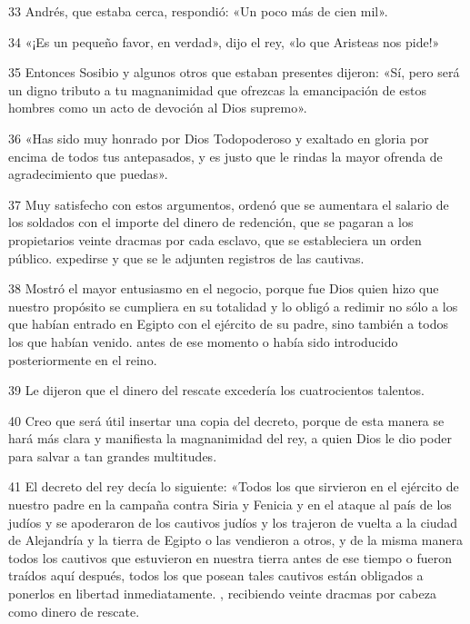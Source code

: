 \par 33 Andrés, que estaba cerca, respondió: «Un poco más de cien mil».

\par 34 «¡Es un pequeño favor, en verdad», dijo el rey, «lo que Aristeas nos pide!»

\par 35 Entonces Sosibio y algunos otros que estaban presentes dijeron: «Sí, pero será un digno tributo a tu magnanimidad que ofrezcas la emancipación de estos hombres como un acto de devoción al Dios supremo».

\par 36 «Has sido muy honrado por Dios Todopoderoso y exaltado en gloria por encima de todos tus antepasados, y es justo que le rindas la mayor ofrenda de agradecimiento que puedas».

\par 37 Muy satisfecho con estos argumentos, ordenó que se aumentara el salario de los soldados con el importe del dinero de redención, que se pagaran a los propietarios veinte dracmas por cada esclavo, que se estableciera un orden público. expedirse y que se le adjunten registros de las cautivas.

\par 38 Mostró el mayor entusiasmo en el negocio, porque fue Dios quien hizo que nuestro propósito se cumpliera en su totalidad y lo obligó a redimir no sólo a los que habían entrado en Egipto con el ejército de su padre, sino también a todos los que habían venido. antes de ese momento o había sido introducido posteriormente en el reino.

\par 39 Le dijeron que el dinero del rescate excedería los cuatrocientos talentos.

\par 40 Creo que será útil insertar una copia del decreto, porque de esta manera se hará más clara y manifiesta la magnanimidad del rey, a quien Dios le dio poder para salvar a tan grandes multitudes.

\par 41 El decreto del rey decía lo siguiente: «Todos los que sirvieron en el ejército de nuestro padre en la campaña contra Siria y Fenicia y en el ataque al país de los judíos y se apoderaron de los cautivos judíos y los trajeron de vuelta a la ciudad de Alejandría y la tierra de Egipto o las vendieron a otros, y de la misma manera todos los cautivos que estuvieron en nuestra tierra antes de ese tiempo o fueron traídos aquí después, todos los que posean tales cautivos están obligados a ponerlos en libertad inmediatamente. , recibiendo veinte dracmas por cabeza como dinero de rescate.

